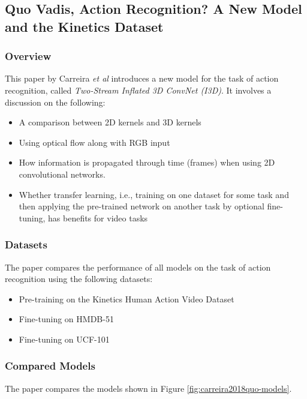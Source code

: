 \subsection{Quo Vadis, Action Recognition? A New Model and the Kinetics Dataset}

\subsubsection{Overview}
This paper by Carreira \textit{et al} introduces a new model for the task of action recognition, called \textit{Two-Stream Inflated 3D ConvNet (I3D)}. It involves a discussion on the following:
\begin{itemize}
\item A comparison between 2D kernels and 3D kernels
\item Using optical flow along with RGB input
\item How information is propagated through time (frames) when using 2D convolutional networks.
\item Whether transfer learning, i.e., training on one dataset for some task and then applying the pre-trained network on another task by optional fine-tuning, has benefits for video tasks
\end{itemize}

\subsubsection{Datasets}
The paper compares the performance of all models on the task of action recognition using the following datasets:
\begin{itemize}
\item Pre-training on the Kinetics Human Action Video Dataset \cite{kay2017kinetics}
\item Fine-tuning on HMDB-51 \cite{kuehne112011hmdb}
\item Fine-tuning on UCF-101 \cite{soomro2012ucf101}
\end{itemize}

\subsubsection{Compared Models}
The paper compares the models shown in Figure \ref{fig:carreira2018quo-models}.

